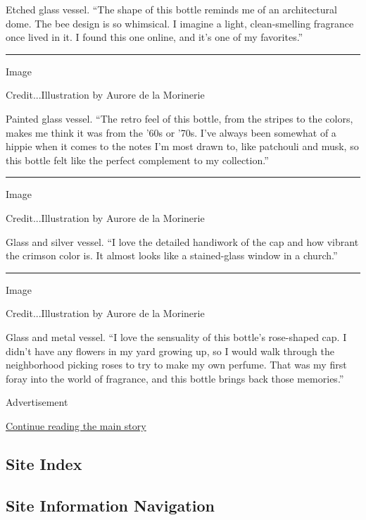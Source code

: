 Etched glass vessel. ``The shape of this bottle reminds me of an
architectural dome. The bee design is so whimsical. I imagine a light,
clean-smelling fragrance once lived in it. I found this one online, and
it's one of my favorites.''

\begin{center}\rule{0.5\linewidth}{\linethickness}\end{center}

Image

Credit...Illustration by Aurore de la Morinerie

Painted glass vessel. ``The retro feel of this bottle, from the stripes
to the colors, makes me think it was from the '60s or '70s. I've always
been somewhat of a hippie when it comes to the notes I'm most drawn to,
like patchouli and musk, so this bottle felt like the perfect complement
to my collection.''

\begin{center}\rule{0.5\linewidth}{\linethickness}\end{center}

Image

Credit...Illustration by Aurore de la Morinerie

Glass and silver vessel. ``I love the detailed handiwork of the cap and
how vibrant the crimson color is. It almost looks like a stained-glass
window in a church.''

\begin{center}\rule{0.5\linewidth}{\linethickness}\end{center}

Image

Credit...Illustration by Aurore de la Morinerie

Glass and metal vessel. ``I love the sensuality of this bottle's
rose-shaped cap. I didn't have any flowers in my yard growing up, so I
would walk through the neighborhood picking roses to try to make my own
perfume. That was my first foray into the world of fragrance, and this
bottle brings back those memories.''

Advertisement

\protect\hyperlink{after-bottom}{Continue reading the main story}

\hypertarget{site-index}{%
\subsection{Site Index}\label{site-index}}

\hypertarget{site-information-navigation}{%
\subsection{Site Information
Navigation}\label{site-information-navigation}}

